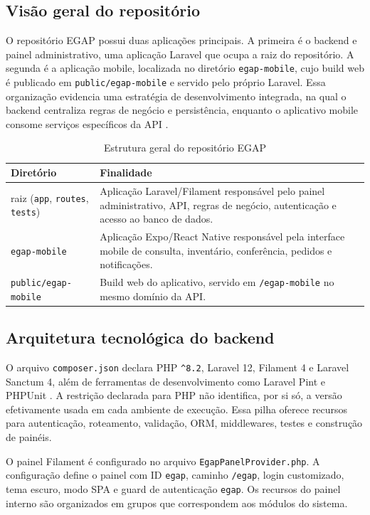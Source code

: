 \documentclass[12pt,a4paper]{article}
\begin{document}
\subsection{Visão geral do repositório}

O repositório EGAP possui duas aplicações principais. A primeira é o backend e painel administrativo, uma aplicação Laravel que ocupa a raiz do repositório. A segunda é a aplicação mobile, localizada no diretório \texttt{egap-mobile}, cujo build web é publicado em \texttt{public/egap-mobile} e servido pelo próprio Laravel. Essa organização evidencia uma estratégia de desenvolvimento integrada, na qual o backend centraliza regras de negócio e persistência, enquanto o aplicativo mobile consome serviços específicos da API \cite{egap-repo}.

\begin{table}[H]
\centering
\caption{Estrutura geral do repositório EGAP}
\begin{tabularx}{\textwidth}{L{4cm}Y}
\toprule
\textbf{Diretório} & \textbf{Finalidade} \\
\midrule
raiz (\texttt{app}, \texttt{routes}, \texttt{tests}) & Aplicação Laravel/Filament responsável pelo painel administrativo, API, regras de negócio, autenticação e acesso ao banco de dados. \\
\texttt{egap-mobile} & Aplicação Expo/React Native responsável pela interface mobile de consulta, inventário, conferência, pedidos e notificações. \\
\texttt{public/egap-mobile} & Build web do aplicativo, servido em \texttt{/egap-mobile} no mesmo domínio da API. \\
\bottomrule
\end{tabularx}
\end{table}

\subsection{Arquitetura tecnológica do backend}

O arquivo \texttt{composer.json} declara PHP \texttt{\^{}8.2}, Laravel 12, Filament 4 e Laravel Sanctum 4, além de ferramentas de desenvolvimento como Laravel Pint e PHPUnit \cite{egap-repo}. A restrição declarada para PHP não identifica, por si só, a versão efetivamente usada em cada ambiente de execução. Essa pilha oferece recursos para autenticação, roteamento, validação, ORM, middlewares, testes e construção de painéis.

O painel Filament é configurado no arquivo \texttt{EgapPanelProvider.php}. A configuração define o painel com ID \texttt{egap}, caminho \texttt{/egap}, login customizado, tema escuro, modo SPA e guard de autenticação \texttt{egap}. Os recursos do painel interno são organizados em grupos que correspondem aos módulos do sistema.
\end{document}
